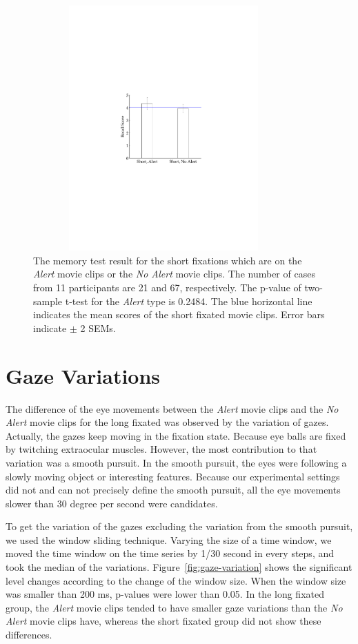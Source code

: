 \documentclass[oneside,master]{snueethesis}
\begin{document}
\begin{figure}
  \centerline{\includegraphics[width=100mm,height=94mm,trim=54mm 90mm 54mm 90mm]{./eps/memtest_short.pdf}}
  \caption[The memory test result for the short fixations which are on the Alert movie clips or the No Alert movie clips]{The memory test result for the short fixations which are on the \textit{Alert} movie clips or the \textit{No Alert} movie clips. The number of cases from 11 participants are 21 and 67, respectively. The p-value of two-sample t-test for the \textit{Alert} type is 0.2484. The blue horizontal line indicates the mean scores of the short fixated movie clips. Error bars indicate $\pm$ 2 SEMs.}
  \label{fig:memtest-short}
\end{figure}


\section{Gaze Variations}
\label{subsec:gaze-variations}

The difference of the eye movements between the \textit{Alert} movie clips and the \textit{No Alert} movie clips for the long fixated was observed by the variation of gazes. Actually, the gazes keep moving in the fixation state. Because eye balls are fixed by twitching extraocular muscles. However, the most contribution to that variation was a smooth pursuit. In the smooth pursuit, the eyes were following a slowly moving object or interesting features. Because our experimental settings did not and can not precisely define the smooth pursuit, all the eye movements slower than 30 degree per second were candidates. 

To get the variation of the gazes excluding the variation from the smooth pursuit, we used the window sliding technique. Varying the size of a time window, we moved the time window on the time series by 1/30 second in every steps, and took the median of the variations. Figure~\ref{fig:gaze-variation} shows the significant level changes according to the change of the window size. When the window size was smaller than 200 ms, p-values were lower than 0.05. In the long fixated group, the \textit{Alert} movie clips tended to have smaller gaze variations than the \textit{No Alert} movie clips have, whereas the short fixated group did not show these differences.
\end{document}
